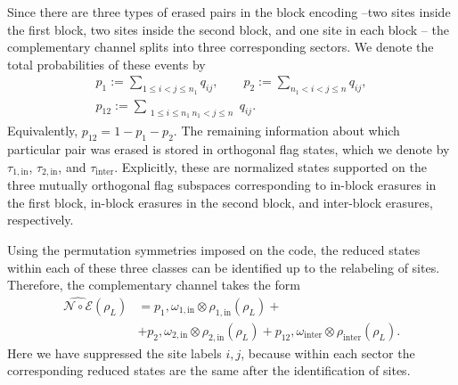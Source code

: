 \documentclass[10pt,twocolumn,superscriptaddress,aps,amsmath,amssymb,citeautoscript,floatfix,prx,longbibliography]{revtex4-2}
\theoremstyle{plain}
\theoremstyle{plain}
\theoremstyle{plain}
\theoremstyle{plain}
\theoremstyle{plain}
\theoremstyle{plain}
\begin{document}
Since there are three types of erased pairs in the block encoding --two sites inside the first block, two sites inside the second block, and one site in each block -- the complementary channel splits into three corresponding sectors. We denote the total probabilities of these events by
\[
\begin{gathered}
p_1:=\sum_{1\leq i<j\leq n_1}q_{ij},
\qquad
p_2:=\sum_{n_1<i<j\leq n}q_{ij},
\\
p_{12}:=\sum_{\substack{1\leq i\leq n_1\ n_1<j\leq n}}q_{ij}.
\end{gathered}
\]
Equivalently, \(p_{12}=1-p_1-p_2\). The remaining information about which particular pair was erased is stored in orthogonal flag states, which we denote by \(\tau_{1,\mathrm{in}}\), \(\tau_{2,\mathrm{in}}\), and \(\tau_{\mathrm{inter}}\). Explicitly, these are normalized states supported on the three mutually orthogonal flag subspaces corresponding to in-block erasures in the first block, in-block erasures in the second block, and inter-block erasures, respectively.

Using the permutation symmetries imposed on the code, the reduced states within each of these three classes can be identified up to the relabeling of sites. Therefore, the complementary channel takes the form
\[
\begin{aligned}
\widehat{\mathcal N\circ\mathcal E}(\rho_L)
&=
p_1,\omega_{1,\mathrm{in}}\otimes
\rho_{1,\mathrm{in}}(\rho_L)
+ \\&+
p_2,\omega_{2,\mathrm{in}}\otimes
\rho_{2,\mathrm{in}}(\rho_L)
+
p_{12},\omega_{\mathrm{inter}}\otimes
\rho_{\mathrm{inter}}(\rho_L).
\end{aligned}
\]
Here we have suppressed the site labels \(i,j\), because within each sector the corresponding reduced states are the same after the identification of sites.
\end{document}
